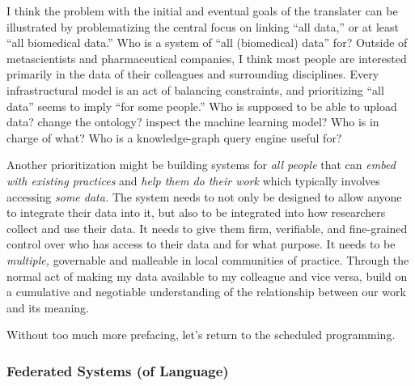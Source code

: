 \documentclass[10pt]{article}
\begin{document}
\begin{multicols}{2}
I think the problem with the initial and eventual goals of the
translater can be illustrated by problematizing the central focus on
linking ``all data,'' or at least ``all biomedical data.'' Who is a
system of ``all (biomedical) data'' for? Outside of metascientists and
pharmaceutical companies, I think most people are interested primarily
in the data of their colleagues and surrounding disciplines. Every
infrastructural model is an act of balancing constraints, and
prioritizing ``all data'' seems to imply ``for some people.'' Who is
supposed to be able to upload data? change the ontology? inspect the
machine learning model? Who is in charge of what? Who is a
knowledge-graph query engine useful for?

Another prioritization might be building systems for \emph{all people}
that can \emph{embed with existing practices} and \emph{help them do
their work} which typically involves accessing \emph{some data.} The
system needs to not only be designed to allow anyone to integrate their
data into it, but also to be integrated into how researchers collect and
use their data. It needs to give them firm, verifiable, and fine-grained
control over who has access to their data and for what purpose. It needs
to be \emph{multiple,} governable and malleable in local communities of
practice. Through the normal act of making my data available to my
colleague and vice versa, build on a cumulative and negotiable
understanding of the relationship between our work and its meaning.

Without too much more prefacing, let's return to the scheduled
programming. 
\end{multicols}


\hypertarget{federated-systems-of-language}{%
\subsubsection{Federated Systems (of
Language)}\label{federated-systems-of-language}}
\end{document}
